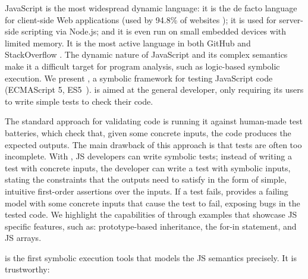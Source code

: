 
JavaScript is the most widespread dynamic language: it is the de facto language for client-side Web applications (used by 94.8\% of websites \cite{JS948percent});
it is used for server-side scripting via Node.js; and it is even run on small embedded devices with limited 
memory. It is the most active language in both GitHub \cite{GithubActive} and StackOverflow \cite{SOActive}.
The dynamic nature of JavaScript and its complex semantics make it a difficult target for
program analysis, such as logic-based symbolic execution.  
We present \jilette, a symbolic framework for testing JavaScript code (ECMAScript 5, ES5~\cite{ecma}). 
%
\jilette is aimed at the general developer, only requiring its users to write simple tests to check their code. 


The standard approach for validating code is running it against 
human-made test batteries, which check that, given some concrete inputs, the code produces the expected
outputs. The main drawback of this approach is that tests are often
too incomplete. With \jilette, JS developers can write symbolic tests; instead of 
writing a test with concrete inputs, the developer can write a test with symbolic inputs,
stating the constraints that the outputs need to satisfy in the form of simple, intuitive 
first-order assertions over the inputs. If a test fails, \jilette provides a failing model with some 
concrete inputs that cause the test to fail, exposing bugs in the tested code. 
We highlight the capabilities of \jilette through examples that showcase
JS specific features, such as: prototype-based inheritance, 
the for-in statement, and JS arrays.


\jilette is the first symbolic execution tools that models the JS semantics precisely. 
It is trustworthy: 







